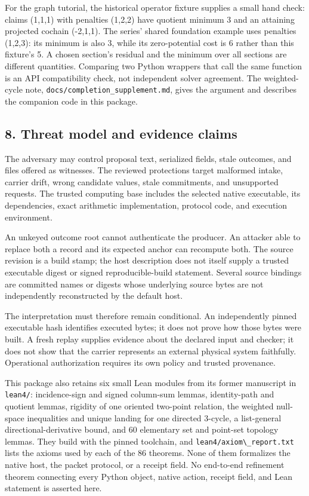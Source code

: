\documentclass[
  11pt,
]{article}
\newcommand{\passthrough}[1]{#1}
\begin{document}
For the graph tutorial, the historical operator fixture supplies a small
hand check: claims (1,1,1) with penalties (1,2,2) have quotient minimum
3 and an attaining projected cochain (-2,1,1). The series' shared
foundation example uses penalties (1,2,3): its minimum is also 3, while
its zero-potential cost is 6 rather than this fixture's 5. A chosen
section's residual and the minimum over all sections are different
quantities. Comparing two Python wrappers that call the same function is
an API compatibility check, not independent solver agreement. The
weighted-cycle note, \nolinkurl{docs/completion_supplement.md}, gives
the argument and describes the companion code in this package.

\subsection{8. Threat model and evidence
claims}\label{threat-model-and-evidence-claims}

The adversary may control proposal text, serialized fields, stale
outcomes, and files offered as witnesses. The reviewed protections
target malformed intake, carrier drift, wrong candidate values, stale
commitments, and unsupported requests. The trusted computing base
includes the selected native executable, its dependencies, exact
arithmetic implementation, protocol code, and execution environment.

An unkeyed outcome root cannot authenticate the producer. An attacker
able to replace both a record and its expected anchor can recompute
both. The source revision is a build stamp; the host description does
not itself supply a trusted executable digest or signed
reproducible-build statement. Several source bindings are committed
names or digests whose underlying source bytes are not independently
reconstructed by the default host.

The interpretation must therefore remain conditional. An independently
pinned executable hash identifies executed bytes; it does not prove how
those bytes were built. A fresh replay supplies evidence about the
declared input and checker; it does not show that the carrier represents
an external physical system faithfully. Operational authorization
requires its own policy and trusted provenance.

This package also retains six small Lean modules from its former
manuscript in \passthrough{\lstinline!lean4/!}: incidence-sign and
signed column-sum lemmas, identity-path and quotient lemmas, rigidity of
one oriented two-point relation, the weighted null-space inequalities
and unique landing for one directed 3-cycle, a list-general
directional-derivative bound, and 60 elementary set and point-set
topology lemmas. They build with the pinned toolchain, and
\passthrough{\lstinline!lean4/axiom\_report.txt!} lists the axioms used
by each of the 86 theorems. None of them formalizes the native host, the
packet protocol, or a receipt field. No end-to-end refinement theorem
connecting every Python object, native action, receipt field, and Lean
statement is asserted here.
\end{document}
